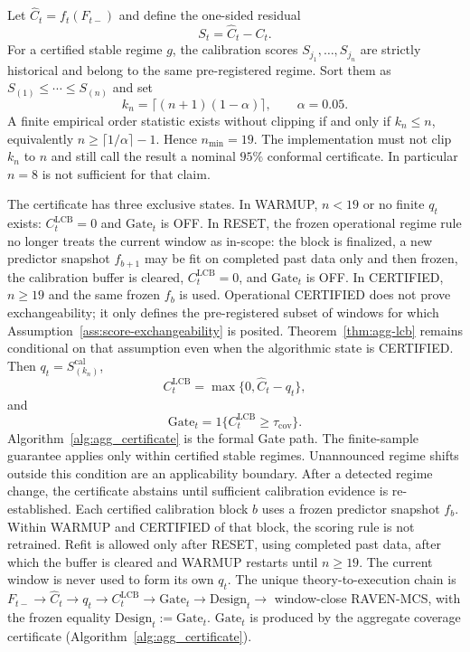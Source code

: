 \documentclass[letterpaper,journal]{IEEEtran}
\begin{document}
Let $\widehat C_t=f_t(F_{t-})$ and define the one-sided residual
\begin{equation}
 S_t=\widehat C_t-C_t.
 \label{eq:agg_St}
\end{equation}
For a certified stable regime $g$, the calibration scores
$S_{j_1},\ldots,S_{j_n}$ are strictly historical and belong to the same
pre-registered regime.  Sort them as $S_{(1)}\le\cdots\le S_{(n)}$ and set
\begin{equation}
 k_n=\lceil(n+1)(1-\alpha)\rceil,
 \qquad
 \alpha=0.05.
 \label{eq:agg_kn}
\end{equation}
A finite empirical order statistic exists without clipping if and only if
$k_n\le n$, equivalently $n\ge\lceil 1/\alpha\rceil-1$.  Hence
$n_{\min}=19$.  The implementation must not clip $k_n$ to $n$ and still call
the result a nominal $95\%$ conformal certificate.  In particular $n=8$ is
not sufficient for that claim.

The certificate has three exclusive states.  In WARMUP, $n<19$ or no
finite $q_t$ exists: $C^{\mathrm{LCB}}_t=0$ and $\mathrm{Gate}_t$ is OFF.
In RESET, the frozen operational regime rule no longer treats the current
window as in-scope: the block is finalized, a new predictor snapshot
$f_{b+1}$ may be fit on completed past data only and then frozen, the
calibration buffer is cleared, $C^{\mathrm{LCB}}_t=0$, and
$\mathrm{Gate}_t$ is OFF.  In CERTIFIED, $n\ge 19$ and the same frozen
$f_b$ is used.  Operational CERTIFIED does not prove exchangeability; it
only defines the pre-registered subset of windows for which
Assumption~\ref{ass:score-exchangeability} is posited.
Theorem~\ref{thm:agg-lcb} remains conditional on that assumption even when
the algorithmic state is CERTIFIED.  Then $q_t=S_{(k_n)}^{\mathrm{cal}}$,
\begin{equation}
 C^{\mathrm{LCB}}_t=\max\{0,\widehat C_t-q_t\},
 \label{eq:agg_CLCB}
\end{equation}
and
\begin{equation}
 \mathrm{Gate}_t=1\{C^{\mathrm{LCB}}_t\ge\tau_{\mathrm{cov}}\}.
 \label{eq:agg_Gate}
\end{equation}
Algorithm~\ref{alg:agg_certificate} is the formal Gate path.  The finite-sample
guarantee applies only within certified stable regimes.  Unannounced regime
shifts outside this condition are an applicability boundary.  After a detected
regime change, the certificate abstains until sufficient calibration evidence
is re-established.  Each certified calibration block $b$ uses a frozen
predictor snapshot $f_b$.  Within WARMUP and CERTIFIED of that block, the
scoring rule is not retrained.  Refit is allowed only after RESET, using
completed past data, after which the buffer is cleared and WARMUP restarts
until $n\ge 19$.  The current window is never used to form its own $q_t$.
The unique theory-to-execution chain is
$F_{t-}\to\widehat C_t\to q_t\to C^{\mathrm{LCB}}_t\to\mathrm{Gate}_t
\to\mathrm{Design}_t\to$ window-close RAVEN-MCS, with the frozen equality
$\mathrm{Design}_t:=\mathrm{Gate}_t$.
$\mathrm{Gate}_t$ is produced by the aggregate coverage certificate
(Algorithm~\ref{alg:agg_certificate}).
\end{document}
